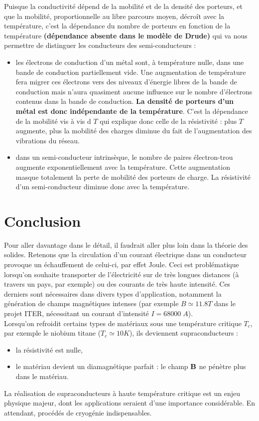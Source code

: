 \documentclass[11pt,a4paper]{report}
\begin{document}
Puisque la conductivité dépend de la mobilité et de la densité des porteurs, et que la mobilité, proportionnelle au libre parcours moyen, décroît avec la température, c'est la dépendance du nombre de porteurs en fonction de la température \textbf{(dépendance absente dans le modèle de Drude)} qui va nous permettre de distinguer les conducteurs des semi-conducteurs :
\begin{itemize}
	\item les électrons de conduction d'un métal sont, à température nulle, dans une bande de conduction partiellement vide. Une augmentation de température fera migrer ces électrons vers des niveaux d'énergie libres de la bande de conduction mais n'aura quasiment aucune influence sur le nombre d'électrons contenus dans la bande de conduction. \textbf{La densité de porteurs d'un métal est donc indépendante de la température}. C'est la dépendance de la mobilité vis à vis d $T$ qui explique donc celle de la résistivité : plus $T$ augmente, plus la mobilité des charges diminue du fait de l'augmentation des vibrations du réseau.\\
	\item dans un semi-conducteur intrinsèque, le nombre de paires électron-trou augmente exponentiellement avec la température. Cette augmentation masque totalement la perte de mobilité des porteurs de charge. La résistivité d'un semi-conducteur diminue donc avec la température.
\end{itemize}

\newpage
\section*{Conclusion}

Pour aller davantage dans le détail, il faudrait aller plus loin dans la théorie des solides. Retenons que la circulation d'un courant électrique dans un conducteur provoque un échauffement de celui-ci, par effet Joule. Ceci est problématique lorsqu'on souhaite transporter de l'électricité sur de très longues distances (à travers un pays, par exemple) ou des courants de très haute intensité. Ces derniers sont nécessaires dans divers types d'application, notamment la génération de champs magnétiques intenses (par exemple $B \simeq 11.8 T$ dans le projet ITER, nécessitant un courant d'intensité $I = 68 000 \;A$).\\

Lorsqu'on refroidit certains types de matériaux sous une température critique $T_c$, par exemple le niobium titane ($T_c \simeq 10 K$), ils deviennent supraconducteurs :
\begin{itemize}
	\item la résistivité est nulle,
	\item le matériau devient un diamagnétique parfait : le champ $\bold{B}$ ne pénètre plus dans le matériau. 
\end{itemize}
La réalisation de supraconducteurs à haute température critique est un enjeu physique majeur, dont les applications seraient d'une importance considérable. En attendant, procédés de cryogénie indispensables.
\end{document}
